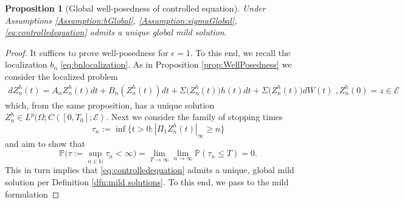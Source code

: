 \documentclass[10pt, reqno]{amsart}
\newcommand{\N}{\mathbb{N}}
\newcommand{\pr}{\mathbb{P}}
\newcommand{\e}{\mathcal{E}}
\newtheorem{prop}{Proposition}
\theoremstyle{definition}
\numberwithin{lem}{section}
\numberwithin{cor}{section}
\numberwithin{prop}{section}
\numberwithin{thm}{section}
\numberwithin{dfn}{section}
\begin{document}
   \begin{prop}[Global well-posedness of controlled equation] \label{prop:WellPosednessGlobal} Under Assumptions \ref{Assumption:bGlobal}, \ref{Assumption:sigmaGlobal},  \eqref{eq:controlledequation} admits a unique global mild solution.    
 \end{prop}

 \begin{proof}  It suffices to prove well-posedness for $\epsilon=1.$ To this end, we recall the localization $b_n$ \eqref{eq:bnlocalization}. As in Proposition \ref{prop:WellPosedness} we consider the localized problem
 \begin{equation}\label{eq:controlledquationLipGlobal}
 	\begin{aligned}
 		dZ^{h}_n(t)=A_\alpha Z^{h}_n(t)dt+B_n(Z_n^{ h}(t))dt+\Sigma\big(Z^{h}_n(t)\big)h(t)dt+\Sigma\big(Z^{h}_n(t)\big)dW(t)\;, Z^{h}_n(0)=z\in\e
 	\end{aligned}
 \end{equation}
which, from the same proposition, has a unique solution $Z^{h}_n\in L^p(\Omega;     C([0,T_0]; \e).$ Next we consider the family of stopping times 
\begin{equation*}\label{eq:localizingtimesGlobal}
	\tau_{n}:=\inf\{t>0 : |\Pi_1 Z^{h}_{n}(t)|_{\infty}\geq n\}
\end{equation*}
and aim to show that
$$ \pr\bigg( \tau:=	\sup_{n\in\N}\tau_n<\infty\bigg)=\lim_{T\to\infty}\lim_{n\to\infty}\pr(\tau_n\leq T)=0.$$
This in turn implies that \eqref{eq:controlledequation} admits a unique, global mild solution per Definition \ref{dfn:mild solutions}. 
 To this end, we pass to the mild formulation
 

\end{proof}
\end{document}
